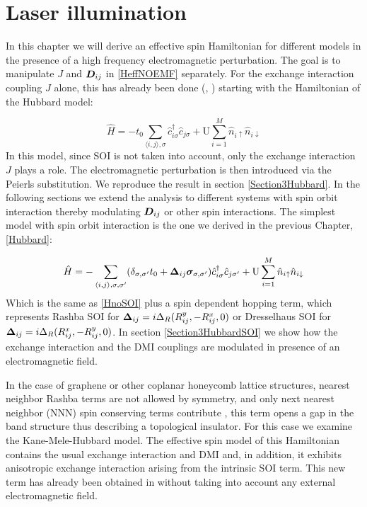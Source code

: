 \chapter{Laser illumination}
\label{ChapPerturbing}

In this chapter we will derive an effective spin Hamiltonian for different models in the presence of a high frequency electromagnetic perturbation. The goal is to manipulate $J$ and $\boldsymbol{D}_{ij}$ in \ref{HeffNOEMF} separately. For the exchange interaction coupling $J$ alone, this has already been done (\cite{Mentink2015}, \cite{Kitamura2017}) starting with the Hamiltonian of the Hubbard model:

\begin{equation}
\label{HnoSOI}
\hat{H} = -t_0\sum_{\langle i,j \rangle, \sigma} \hat{c}_{i \sigma}^\dagger \hat{c}_{j \sigma} + \text{U} \sum_{i=1}^M \hat{n}_{i\uparrow}\hat{n}_{i\downarrow}
\end{equation} 
In this model, since SOI is not taken into account, only the exchange interaction $J$ plays a role. The electromagnetic perturbation is then introduced via the Peierls substitution. We reproduce the result in section \ref{Section3Hubbard}. In the following sections we extend the analysis to different systems with spin orbit interaction thereby modulating $\boldsymbol{D}_{ij}$ or other spin interactions. The simplest model with spin orbit interaction is the one we derived in the previous Chapter, \ref{Hubbard}:

\begin{equation*}
\hat{H} = -\sum_{\langle i,j \rangle, \sigma, \sigma'}(\delta_{\sigma, \sigma'} t_{0} + \boldsymbol{\Delta}_{ij} \boldsymbol{\sigma}_{\sigma, \sigma'})\hat{c}_{i \sigma}^\dagger \hat{c}_{j \sigma'} + \text{U} \sum_{i=1}^M \hat{n}_{i\uparrow}\hat{n}_{i\downarrow}
\end{equation*}
Which is the same as \ref{HnoSOI} plus a spin dependent hopping term, which represents Rashba SOI for $\boldsymbol{\Delta}_{ij} = i\Delta_R(R_{ij}^y, -R_{ij}^x, 0)$ or Dresselhaus SOI for $\boldsymbol{\Delta}_{ij} = i\Delta_R(R_{ij}^x, -R_{ij}^y, 0)$. In section \ref{Section3HubbardSOI} we show how the exchange interaction and the DMI couplings are modulated in presence of an electromagnetic field.  

In the case of graphene or other coplanar honeycomb lattice structures, nearest neighbor Rashba terms are not allowed by symmetry, and only next nearest neighbor (NNN) spin conserving terms contribute \cite{Kane2005}, this term opens a gap in the band structure thus describing a topological insulator. For this case we examine the Kane-Mele-Hubbard model. The effective spin model of this Hamiltonian contains the usual exchange interaction and DMI and, in addition, it exhibits anisotropic exchange interaction arising from the intrinsic SOI term. This new term has already been obtained in \cite{Rachel2010} without taking into account any external electromagnetic field.

